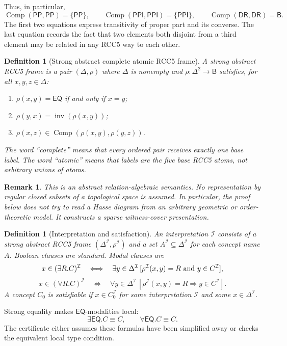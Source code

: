 \documentclass[11pt]{article}
\newtheorem{definition}[theorem]{Definition}
\newtheorem{remark}[theorem]{Remark}
\newcommand{\Base}{\mathsf B}
\newcommand{\EQ}{\mathsf{EQ}}
\newcommand{\DR}{\mathsf{DR}}
\newcommand{\PP}{\mathsf{PP}}
\newcommand{\PPI}{\mathsf{PPI}}
\newcommand{\Inv}{\operatorname{inv}}
\newcommand{\comp}{\operatorname{Comp}}
\newcommand{\I}{\mathcal I}
\begin{document}
Thus, in particular,
\[
  \comp(\PP,\PP)=\{\PP\},\qquad
  \comp(\PPI,\PPI)=\{\PPI\},\qquad
  \comp(\DR,\DR)=\Base.
\]
The first two equations express transitivity of proper part and its converse.  The last equation records the fact that two elements both disjoint from a third element may be related in any RCC5 way to each other.

\begin{definition}[Strong abstract complete atomic RCC5 frame]\label{def:frame}
A strong abstract RCC5 frame is a pair $(\Delta,\rho)$ where $\Delta$ is nonempty and $\rho:\Delta^2\to\Base$ satisfies, for all $x,y,z\in\Delta$:
\begin{enumerate}[label=(F\arabic*)]
\item $\rho(x,y)=\EQ$ if and only if $x=y$;
\item $\rho(y,x)=\Inv(\rho(x,y))$;
\item $\rho(x,z)\in\comp(\rho(x,y),\rho(y,z))$.
\end{enumerate}
The word ``complete'' means that every ordered pair receives exactly one base label.  The word ``atomic'' means that labels are the five base RCC5 atoms, not arbitrary unions of atoms.
\end{definition}

\begin{remark}
This is an abstract relation-algebraic semantics.  No representation by regular closed subsets of a topological space is assumed.  In particular, the proof below does not try to read a Hasse diagram from an arbitrary geometric or order-theoretic model.  It constructs a sparse witness-cover presentation.
\end{remark}

\begin{definition}[Interpretation and satisfaction]\label{def:satisfaction}
An interpretation $\I$ consists of a strong abstract RCC5 frame $(\Delta^\I,\rho^\I)$ and a set $A^\I\subseteq\Delta^\I$ for each concept name $A$.  Boolean clauses are standard.  Modal clauses are
\[
 x\in(\exists R.C)^\I
 \quad\Longleftrightarrow\quad
 \exists y\in\Delta^\I\,[\rho^\I(x,y)=R\hbox{ and }y\in C^\I],
\]
\[
 x\in(\forall R.C)^\I
 \quad\Longleftrightarrow\quad
 \forall y\in\Delta^\I\,[\rho^\I(x,y)=R\Rightarrow y\in C^\I].
\]
A concept $C_0$ is satisfiable if $x\in C_0^\I$ for some interpretation $\I$ and some $x\in\Delta^\I$.
\end{definition}

Strong equality makes $\EQ$-modalities local:
\[
  \exists\EQ.C\equiv C,
  \qquad
  \forall\EQ.C\equiv C.
\]
The certificate either assumes these formulas have been simplified away or checks the equivalent local type condition.
\end{document}
